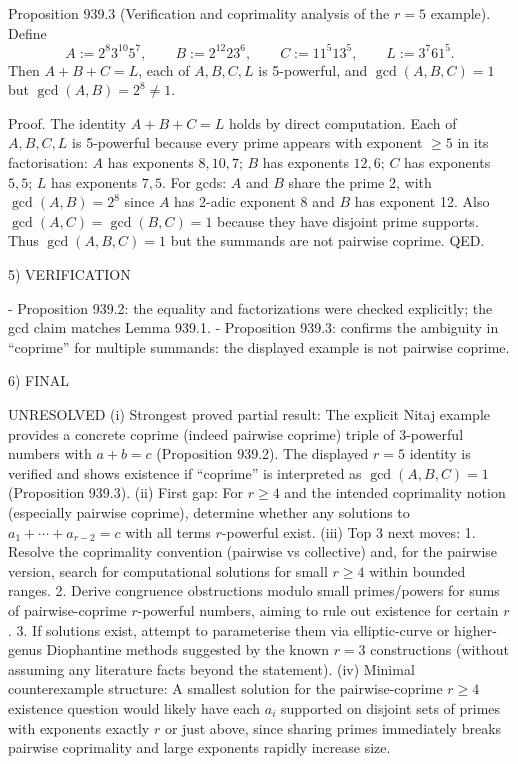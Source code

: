 Proposition 939.3 (Verification and coprimality analysis of the \(r=5\) example).
Define
\[A:=2^8 3^{10}5^7,\qquad B:=2^{12}23^6,\qquad C:=11^5 13^5,\qquad L:=3^7 61^5.
\]
Then \(A+B+C=L\), each of \(A,B,C,L\) is 5-powerful, and \(\gcd(A,B,C)=1\) but \(\gcd(A,B)=2^8\ne 1\).

Proof.
The identity \(A+B+C=L\) holds by direct computation.
Each of \(A,B,C,L\) is 5-powerful because every prime appears with exponent \(\ge 5\) in its factorisation:
\(A\) has exponents \(8,10,7\); \(B\) has exponents \(12,6\); \(C\) has exponents \(5,5\); \(L\) has exponents \(7,5\).
For gcds: \(A\) and \(B\) share the prime 2, with \(\gcd(A,B)=2^8\) since \(A\) has 2-adic exponent 8 and \(B\) has exponent 12. Also \(\gcd(A,C)=\gcd(B,C)=1\) because they have disjoint prime supports. Thus \(\gcd(A,B,C)=1\) but the summands are not pairwise coprime. QED.

5) VERIFICATION

- Proposition 939.2: the equality and factorizations were checked explicitly; the gcd claim matches Lemma 939.1.
- Proposition 939.3: confirms the ambiguity in ``coprime'' for multiple summands: the displayed example is not pairwise coprime.

6) FINAL

UNRESOLVED
(i) Strongest proved partial result: The explicit Nitaj example provides a concrete coprime (indeed pairwise coprime) triple of 3-powerful numbers with \(a+b=c\) (Proposition 939.2). The displayed \(r=5\) identity is verified and shows existence if ``coprime'' is interpreted as \(\gcd(A,B,C)=1\) (Proposition 939.3).
(ii) First gap: For \(r\ge 4\) and the intended coprimality notion (especially pairwise coprime), determine whether any solutions to \(a_1+\cdots+a_{r-2}=c\) with all terms \(r\)-powerful exist.
(iii) Top 3 next moves:
  1. Resolve the coprimality convention (pairwise vs collective) and, for the pairwise version, search for computational solutions for small \(r\ge4\) within bounded ranges.
  2. Derive congruence obstructions modulo small primes/powers for sums of pairwise-coprime \(r\)-powerful numbers, aiming to rule out existence for certain \(r\).
  3. If solutions exist, attempt to parameterise them via elliptic-curve or higher-genus Diophantine methods suggested by the known \(r=3\) constructions (without assuming any literature facts beyond the statement).
(iv) Minimal counterexample structure: A smallest solution for the pairwise-coprime \(r\ge4\) existence question would likely have each \(a_i\) supported on disjoint sets of primes with exponents exactly \(r\) or just above, since sharing primes immediately breaks pairwise coprimality and large exponents rapidly increase size.



